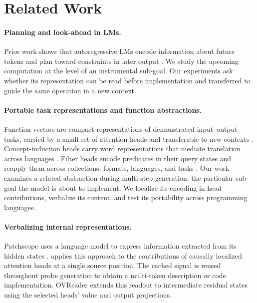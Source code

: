 \section{Related Work}
\label{sec:related}

\paragraph{Planning and look-ahead in LMs.} Prior work shows that autoregressive LMs encode information about future tokens \citep{pal2023futurelens} and plan toward constraints in later output \citep{lindsey2025biology}. We study the upcoming computation at the level of an instrumental sub-goal. Our experiments ask whether its representation can be read before implementation and transferred to guide the same operation in a new context.

\paragraph{Portable task representations and function abstractions.} Function vectors are compact representations of demonstrated input--output tasks, carried by a small set of attention heads and transferable to new contexts \citep{todd2024function}. Concept-induction heads carry word representations that mediate translation across languages \citep{feucht2025dual}. Filter heads encode predicates in their query states and reapply them across collections, formats, languages, and tasks \citep{sensharma2025filterheads}. Our work examines a related abstraction during multi-step generation: the particular sub-goal the model is about to implement. We localize its encoding in head contributions, verbalize its content, and test its portability across programming languages.

\paragraph{Verbalizing internal representations.} Patchscope uses a language model to express information extracted from its hidden states \citep{ghandeharioun2024patchscope}. \goalscope applies this approach to the contributions of causally localized attention heads at a single source position. The cached signal is reused throughout probe generation to obtain a multi-token description or code implementation. OVReader extends this readout to intermediate residual states using the selected heads' value and output projections.


